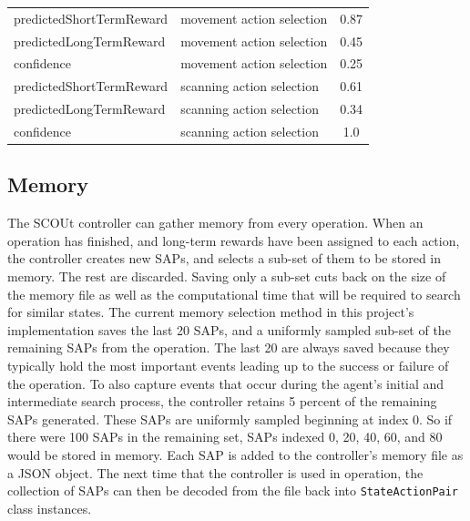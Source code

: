 \begin{center}
\begin{tabular}{ l l c }
    predictedShortTermReward          & movement action selection       & 0.87  \\
    predictedLongTermReward           & movement action selection       & 0.45  \\
    confidence                        & movement action selection       & 0.25  \\
    predictedShortTermReward          & scanning action selection       & 0.61  \\
    predictedLongTermReward           & scanning action selection       & 0.34  \\
    confidence                        & scanning action selection       & 1.0   \\
    \hline
  \end{tabular}
\end{center}


\subsection{Memory}
The SCOUt controller can gather memory from every operation.
When an operation has finished, and long-term rewards have been assigned to each action, the controller creates new SAPs, and selects a sub-set of them to be stored in memory.
The rest are discarded.
Saving only a sub-set cuts back on the size of the memory file as well as the computational time that will be required to search for similar states.
The current memory selection method in this project's implementation saves the last 20 SAPs, and a uniformly sampled sub-set of the remaining SAPs from the operation.
The last 20 are always saved because they typically hold the most important events leading up to the success or failure of the operation.
To also capture events that occur during the agent's initial and intermediate search process, the controller retains 5 percent of the remaining SAPs generated.
These SAPs are uniformly sampled beginning at index 0.
So if there were 100 SAPs in the remaining set, SAPs indexed 0, 20, 40, 60, and 80 would be stored in memory.
Each SAP is added to the controller's memory file as a JSON object.
The next time that the controller is used in operation, the collection of SAPs can then be decoded from the file back into \texttt{StateActionPair} class instances.


